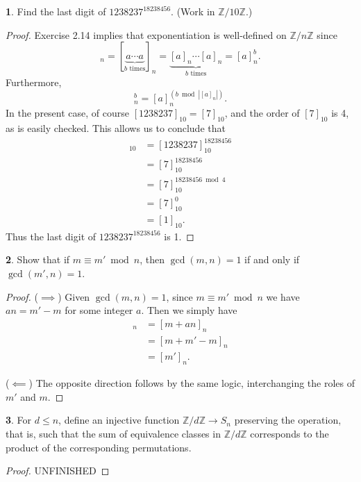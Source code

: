 \documentclass{article}
\theoremstyle{definition}
\newtheorem{ex}{}[section]
\begin{document}
\begin{ex}
	Find the last digit of $1238237^{18238456}$.
	(Work in $\mathbb{Z}/10 \mathbb{Z}$.)
\end{ex}
\begin{proof}
	Exercise 2.14 implies that exponentiation is well-defined on $\mathbb{Z}/n \mathbb{Z}$ since \begin{equation*}
		[a^b]_n = [\underbrace{a \cdots a}_{\text{$b$ times}}]_n = \underbrace{[a]_n \cdots [a]_n}_{\text{$b$ times}} = [a]_n^b.
	\end{equation*}
	Furthermore, \begin{equation*}
		[a]_n^b = [a]_n^{(b \bmod |[a]_n|)}.
	\end{equation*}
	In the present case, of course $[1238237]_{10} = [7]_{10}$, and the order of $[7]_{10}$ is 4, as is easily checked.
	This allows us to conclude that \begin{align*}
		[1238237^{18238456}]_{10} & = [1238237]_{10}^{18238456}   \\
		                          & = [7]_{10}^{18238456}         \\
		                          & = [7]_{10}^{18238456 \bmod 4} \\
		                          & = [7]_{10}^{0}                \\
		                          & = [1]_{10}.
	\end{align*}
	Thus the last digit of $1238237^{18238456}$ is 1.
\end{proof}

\begin{ex}
	Show that if $m \equiv m' \bmod n$, then $\gcd(m, n) = 1$ if and only if $\gcd(m', n) = 1$.
\end{ex}
\begin{proof}
	($\implies$) Given $\gcd(m, n) = 1$, since $m \equiv m' \bmod n$ we have $an = m' - m$ for some integer $a$.
	Then we simply have \begin{align*}
		[m]_n & = [m + an]_n     \\
		      & = [m + m' - m]_n \\
		      & = [m']_n.
	\end{align*}

	($\impliedby$) The opposite direction follows by the same logic, interchanging the roles of $m'$ and $m$.
\end{proof}

\begin{ex}
	For $d \leq n$, define an injective function $\mathbb{Z}/d \mathbb{Z} \to S_n$ preserving the operation, that is, such that the sum of equivalence classes in $\mathbb{Z}/d \mathbb{Z}$ corresponds to the product of the corresponding permutations.
\end{ex}
\begin{proof}
  UNFINISHED
\end{proof}
\end{document}
